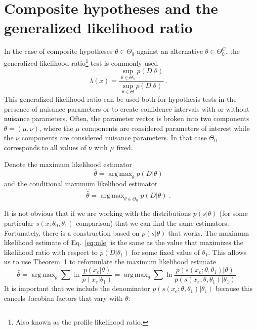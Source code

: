 \documentclass[aoas,preprint]{imsart}
\DeclareMathOperator*{\argmax}{arg\,max}
\numberwithin{equation}{section}
\theoremstyle{plain}
\begin{document}
\section{Composite hypotheses and the generalized likelihood ratio}\label{S:GLR}

In the case of composite hypotheses $\theta \in \Theta_0$ against an alternative $\theta \in \Theta_0^C$, the generalized likelihood ratio\footnote{Also known as the profile likelihood ratio.} test is commonly used
\begin{equation}
\lambda(x) =  \frac{ \sup_{\theta \in \Theta_0} p(D | \theta)}{ \sup_{\theta \in \Theta} p(D | \theta)} \; .
\end{equation}
This generalized likelihood ratio can be used both for hypothesis tests in the presence of nuisance parameters or to create confidence intervals with or without nuisance parameters.  Often, the parameter vector is broken into two components $\theta=(\mu,\nu)$, where the $\mu$ components are considered parameters of interest while the $\nu$ components are considered nuisance parameters. In that case $\Theta_0$ corresponds to all values of $\nu$ with $\mu$ fixed.

Denote the maximum likelihood estimator
\begin{equation}\label{eq:mle}
\hat{\theta} = \argmax_\theta  p(D | \theta)
\end{equation}
and the conditional maximum likelihood estimator
\begin{equation}\label{eq:cmle}
\hat{\hat{\theta}} = \argmax_{\theta \in \Theta_0}  p(D | \theta) \; .
\end{equation}

It is not obvious that if we are working with the distributions $p(s|\theta)$ (for some particular $s(x; \theta_0, \theta_1)$ comparison) that we can find the same estimators. 
Fortunately, there is a construction based on $p(s|\theta)$ that works. The maximum likelihood estimate of Eq.~\ref{eq:mle} is the same as the value that maximizes the likelihood ratio with respect to $p(D|\theta_1)$ for some fixed value of $\theta_1$. This allows us to use Theorem~1 to reformulate the maximum likelihood estimate
\begin{equation}\label{eq:mle_withs}
\hat{\theta} = %
\argmax_\theta  \sum \ln \frac{p(x_e | \theta)}{p(x_e|\theta_1)} = \argmax_\theta  \sum \ln \frac{p(s(x_e; \theta, \theta_1) | \theta)}{p(s(x_e; \theta, \theta_1) |\theta_1)} \; .
\end{equation}
It is important that we include the denominator $p(s(x_e; \theta, \theta_1) |\theta_1)$ because this cancels Jacobian factors that vary with $\theta$.
\end{document}
